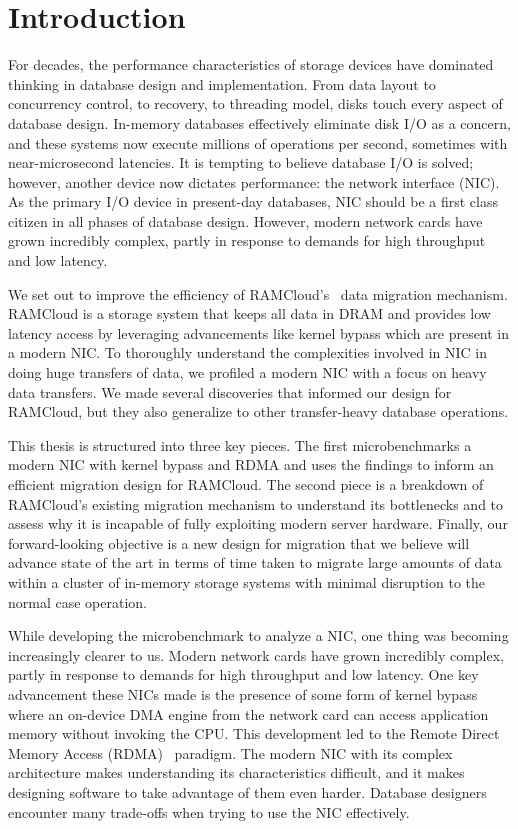 
\chapter{Introduction}

For decades, the performance characteristics of storage devices have dominated
     thinking in database design and implementation. From data layout to
concurrency control, to recovery, to threading model, disks touch every aspect
of database design. In-memory databases effectively eliminate disk I/O as a
concern, and these systems now execute millions of operations per second,
sometimes with near-microsecond latencies.  It is tempting to believe 
database I/O is solved; however, another device now dictates
performance: the network interface (NIC). As the primary I/O device in present-day databases,
NIC should be a first class citizen in all phases of database design.
However, modern network cards have grown incredibly complex, partly in response
to demands for high throughput and low latency.

We set out to improve the efficiency of RAMCloud's~\cite{ramcloud} data migration mechanism. 
RAMCloud is a storage system that keeps all data in DRAM and provides low latency access by
leveraging advancements like kernel bypass which are present in a modern NIC.
To thoroughly understand the complexities involved in NIC in doing huge
transfers of data, we profiled a modern NIC with a focus on heavy data transfers.
 We made several discoveries that informed our design for RAMCloud,
 but they also generalize to other transfer-heavy database operations. 

This thesis is structured into three key pieces. The first microbenchmarks a modern NIC 
with kernel bypass and RDMA and uses the findings to inform an efficient   migration design for RAMCloud.
The second piece is a breakdown of RAMCloud’s existing migration mechanism to understand its bottlenecks
and to assess why it is incapable of fully exploiting modern server hardware. 
Finally, our forward-looking objective is a new design for migration that we believe will advance state of the art
in terms of time taken to migrate large amounts of data within a cluster of in-memory storage systems
with minimal disruption to the normal case operation.

While developing the microbenchmark to analyze a NIC, one thing was becoming increasingly clearer to us.
Modern network cards have grown incredibly complex, partly in response to
demands for high throughput and low latency. One key advancement these NICs made 
is the presence of some form of kernel bypass where an on-device DMA engine from the network card 
can access application memory without invoking the CPU. This development led to the Remote 
Direct Memory Access (RDMA)~\cite{rdmapatent} paradigm. The modern NIC with its complex architecture
makes understanding its characteristics difficult, and it makes designing software to take advantage
of them even harder. Database designers encounter many trade-offs when trying to use the NIC effectively.


